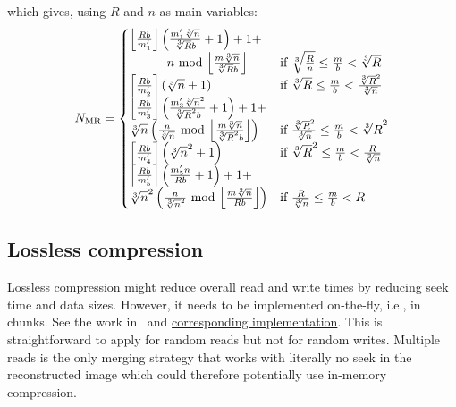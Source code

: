\documentclass[10pt, conference, compsocconf]{IEEEtran}
\DeclarePairedDelimiter{\ceil}{\lceil}{\rceil}
\DeclarePairedDelimiter{\floor}{\lfloor}{\rfloor}
\begin{document}
which gives, using $R$ and $n$ as main variables:
\begin{equation}
N_\mathrm{MR} =
\begin{cases}
  \floor*{\frac{Rb}{m_1'}}\left(\frac{m_1'\sqrt[3]{n}}{\sqrt[3]{R}b}+1\right)+1+\\
  \quad \quad \quad n \text{ mod }\floor*{\frac{m\sqrt[3]{n}}{\sqrt[3]{R}b}}\
  & \text{if } \sqrt[3]{\frac{R}{n}} \leq \frac{m}{b} < \sqrt[3]{R}\\
  
  \ceil*{\frac{Rb}{m_2'}}\left(\sqrt[3]{n}+1\right)\
  & \text{if } \sqrt[3]{R} \leq \frac{m}{b} < \frac{\sqrt[3]{R}^2}{\sqrt[3]{n}}\\

  \floor*{\frac{Rb}{m_3'}}\left(\frac{m'_3\sqrt[3]{n}^2}{\sqrt[3]{R}^2b}+1\right)+1+\\
  \sqrt[3]{n}\left( \frac{n}{\sqrt[3]{n}} \text{ mod } \floor*{\frac{m\sqrt[3]{n}}{\sqrt[3]{R}^2b}} \right)
  & \text{if } \frac{\sqrt[3]{R}^2}{\sqrt[3]{n}} \leq \frac{m}{b} < \sqrt[3]{R}^2\\
  
  \ceil*{\frac{Rb}{m_4'}}\left(\sqrt[3]{n}^2+1\right)\
  & \text{if } \sqrt[3]{R}^2 \leq \frac{m}{b} < \frac{R}{\sqrt[3]{n}}\\
  
  \ceil*{\frac{Rb}{m_5'}}\left(\frac{m_5'n}{Rb}+1\right)+1+\\
  \sqrt[3]{n}^2\left( \frac{n}{\sqrt[3]{n}^2} \text{ mod } \floor*{\frac{m\sqrt[3]{n}}{Rb}}\right)
  & \text{if } \frac{R}{\sqrt[3]{n}} \leq \frac{m}{b} < R
\end{cases} \label{eq:seeks-multiple-reads}
\end{equation}


\subsection{Lossless compression}
     
Lossless compression might reduce overall read and write times by
reducing seek time and data sizes. However, it needs to be implemented
on-the-fly, i.e., in chunks. See the work in~\cite{rajna2015speeding}
and
\href{https://github.com/pauldmccarthy/indexed\_gzip}{corresponding
  implementation}. This is straightforward to apply for random reads
but not for random writes. Multiple reads is the only merging strategy
that works with literally no seek in the reconstructed image which
could therefore potentially use in-memory compression.
\end{document}
